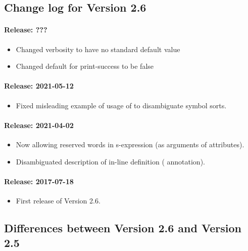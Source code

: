 \subsection{Change log for Version 2.6}

\paragraph{Release: ???}
\begin{itemize}
\item    Changed verbosity to have no standard default value
\item    Changed default for print-success to be false
\end{itemize}

\paragraph{Release: 2021-05-12}
\begin{itemize}
\item Fixed misleading example of usage of  to disambiguate symbol sorts.
\end{itemize}

\paragraph{Release: 2021-04-02}
\begin{itemize}
\item Now allowing reserved words in s-expression (as arguments of attributes).
\item Disambiguated description of in-line definition ( annotation).
\end{itemize}


\paragraph{Release: 2017-07-18}
\begin{itemize}
\item First release of Version 2.6.
\end{itemize}

\subsection{Differences between Version 2.6 and Version 2.5}

